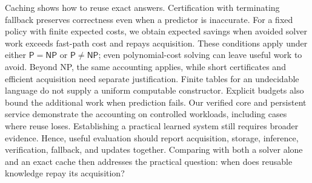 \documentclass[11pt,a4paper]{article}
\numberwithin{equation}{section}
\newcommand{\Pclass}{\mathsf{P}}
\newcommand{\NPclass}{\mathsf{NP}}
\theoremstyle{plain}
\theoremstyle{definition}
\theoremstyle{remark}
\begin{document}
Caching shows how to reuse exact answers. Certification with terminating fallback preserves correctness even when a predictor is inaccurate. For a fixed policy with finite expected costs, we obtain expected savings when avoided solver work exceeds fast-path cost and repays acquisition. These conditions apply under either $\Pclass=\NPclass$ or $\Pclass\neq\NPclass$; even polynomial-cost solving can leave useful work to avoid. Beyond NP, the same accounting applies, while short certificates and efficient acquisition need separate justification. Finite tables for an undecidable language do not supply a uniform computable constructor. Explicit budgets also bound the additional work when prediction fails. Our verified core and persistent service demonstrate the accounting on controlled workloads, including cases where reuse loses. Establishing a practical learned system still requires broader evidence. Hence, useful evaluation should report acquisition, storage, inference, verification, fallback, and updates together. Comparing with both a solver alone and an exact cache then addresses the practical question: when does reusable knowledge repay its acquisition?
\end{document}
